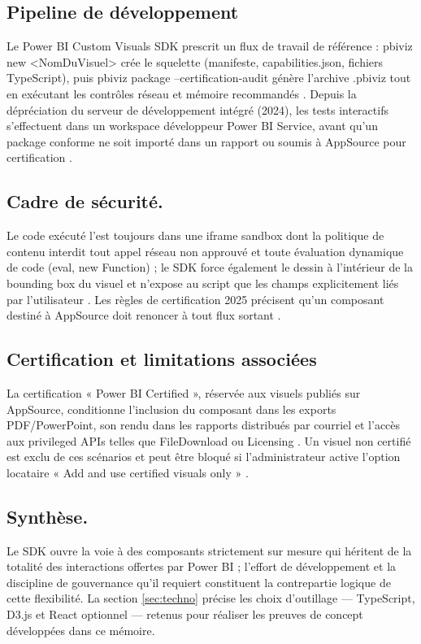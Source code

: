 \subsection{Pipeline de développement}\label{sec:pipeline-ref}

Le Power BI Custom Visuals SDK prescrit un flux de travail de référence :  
pbiviz new <NomDuVisuel> crée le squelette (manifeste, capabilities.json, fichiers TypeScript),  
puis pbiviz package --certification-audit génère l’archive .pbiviz tout en exécutant les contrôles réseau et mémoire recommandés \parencite{MicrosoftAuditCLI2025}.  
Depuis la dépréciation du serveur de développement intégré (2024), les tests interactifs s’effectuent dans un workspace développeur Power BI Service, avant qu’un package conforme ne soit importé dans un rapport ou soumis à AppSource pour certification \parencite{MicrosoftCertificationGuide2025}.

\subsection{Cadre de sécurité.} Le code exécuté l’est toujours dans une iframe sandbox dont la politique de contenu interdit tout appel réseau non approuvé et toute évaluation dynamique de code (eval, new Function) ; le SDK force également le dessin à l’intérieur de la bounding box du visuel et n’expose au script que les champs explicitement liés par l’utilisateur \parencite{OkVizSandbox2022}. Les règles de certification 2025 précisent qu’un composant destiné à AppSource doit renoncer à tout flux sortant \parencite{MicrosoftAPIv6CSP2025}.  

\subsection{Certification et limitations associées}\label{sec:certification}

La certification « Power BI Certified », réservée aux visuels publiés sur AppSource, conditionne l’inclusion du composant dans les exports PDF/PowerPoint, son rendu dans les rapports distribués par courriel et l’accès aux privileged APIs telles que FileDownload ou Licensing \parencite{MicrosoftCustomVisualsCertified2025, MicrosoftFileDownloadAPI2024}. Un visuel non certifié est exclu de ces scénarios et peut être bloqué si l’administrateur active l’option locataire « Add and use certified visuals only » \parencite{MicrosoftTenantSettings2024}.

\subsection{Synthèse.} Le SDK ouvre la voie à des composants strictement sur mesure qui héritent de la totalité des interactions offertes par Power BI ; l’effort de développement et la discipline de gouvernance qu’il requiert constituent la contrepartie logique de cette flexibilité. La section \ref{sec:techno} précise les choix d’outillage — TypeScript, D3.js et React optionnel — retenus pour réaliser les preuves de concept développées dans ce mémoire.
